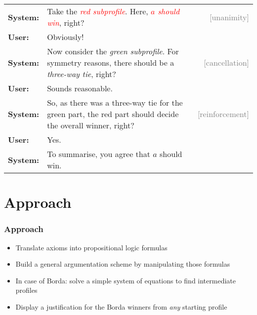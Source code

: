 \documentclass[english]{beamer}
\newcommand{\highlight}[1]{\textcolor{darkgreen}{#1}}
\begin{document}
\begin{frame}
	\begin{center}
		\fbox{%
			$\begin{array}{lc}
				\text{\textcolor{red}{Voter 1:}} & \textcolor{red}{a\succ b\succ c} \\
				\highlight{\text{Voter 2:}} & \highlight{ a\succ b\succ c} \\
				\highlight{\text{Voter 3:}} & \highlight{ c\succ b\succ a} 
			\end{array}$%
		}
	\end{center}
	
	\begin{tabular}{@{}lp{6.8cm}r@{}}
		\textbf{System:} & Take the \textcolor{red}{\textit{red subprofile}}. Here, \textcolor{red}{\textit{$a$ should win}}, right? & \textcolor{gray}{[unanimity]} \\
		\textbf{User:} & Obviously! & \\
		\textbf{System:} & Now consider the \emph{green subprofile}. For symmetry reasons, there should be a \emph{three-way tie}, right? & \textcolor{gray}{[cancellation]} \\
		\textbf{User:} & Sounds reasonable. & \\
		\textbf{System:} &  So, as there was a three-way tie for the green part, the red part should decide the overall winner, right? & \textcolor{gray}{[reinforcement]} \\
		\textbf{User:} & Yes. \\
		\textbf{System:} & To summarise, you agree that $a$ should win. 
	\end{tabular}
\end{frame}

\section{Approach}
\begin{frame}
	\frametitle{Approach}
	
	\begin{itemize}
		\item Translate axioms into propositional logic formulas
		\item Build a general argumentation scheme by manipulating those formulas
		\item In case of Borda: solve a simple system of equations to find intermediate profiles
		\item Display a justification for the Borda winners from \emph{any} starting profile
	\end{itemize}
\end{frame}
\end{document}
